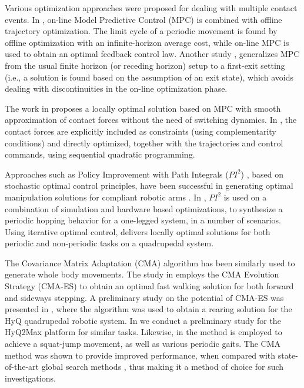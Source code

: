 \documentclass[usletter, 10pt, conference]{ieeeconf}      %
\begin{document}
Various optimization approaches were proposed for dealing with multiple contact events. 
In \cite{Erez2011}, on-line Model Predictive Control (MPC) is combined with offline trajectory optimization. The 
limit cycle of a periodic movement is found by offline optimization with an infinite-horizon 
average cost, while on-line MPC is used to obtain an optimal feedback control law. Another study 
\cite{kulchenko2011}, generalizes MPC from the usual finite horizon (or receding horizon) setup to a 
first-exit setting (i.e., a solution is found based on the assumption of an exit state), which 
avoids dealing with discontinuities in the on-line optimization phase. 

The work in \cite{tassa_todorov.iros2012} proposes a locally optimal solution based on MPC with smooth
approximation of contact forces without the need of switching dynamics. In \cite{posa_tedrake.IJRR2014}, the contact 
forces are explicitly included as constraints (using complementarity conditions) and directly 
optimized, together with the trajectories and control commands, using sequential quadratic 
programming. 

Approaches such as Policy Improvement with Path Integrals ($PI^2$) \cite{theodorou2010generalized}, 
based on stochastic optimal control principles, have been successful in  generating 
optimal manipulation solutions for compliant robotic arms \cite{kalakrishnan2011learning}. In \cite{fankhauser2013reinforcement},
$PI^2$ is used on a combination of simulation and hardware based optimizations, to synthesize a periodic hopping behavior
for a one-legged system, in a number of scenarios. Using iterative optimal control, \cite{neunert2016trajectory} 
delivers locally optimal solutions for both periodic and non-periodic tasks on a quadrupedal system.

The Covariance Matrix Adaptation (CMA) algorithm \cite{hansen2001completely} 
has been similarly used to generate whole body movements. 
The study in \cite{shafii2015learning} employs the CMA Evolution Strategy 
(CMA-ES) to obtain an optimal fast walking solution
for both forward and sideways stepping. 
A preliminary study on the potential of CMA-ES was presented in \cite{havoutis2014optimization}, where the algorithm 
was used to obtain a rearing solution for the HyQ quadrupedal robotic system. 
In \cite{radulescu2016optimization} we conduct a preliminary study for the 
HyQ2Max platform for similar tasks. Likewise, in \cite{gehring2016practice}
the method is employed to achieve a squat-jump movement, as well as various periodic gaits.
The CMA method was shown to provide improved performance,
when compared with state-of-the-art global search methods \cite{hansen2004evaluating}, 
thus making it a method of choice for such investigations. 
\end{document}
